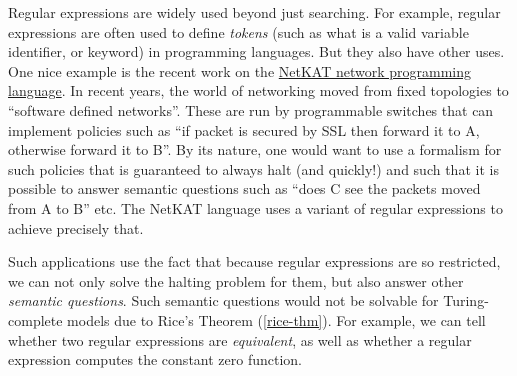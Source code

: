 Regular expressions are widely used beyond just searching. For example,
regular expressions are often used to define \emph{tokens} (such as what
is a valid variable identifier, or keyword) in programming languages.
But they also have other uses. One nice example is the recent work on
the \href{https://goo.gl/oeJNuw}{NetKAT network programming language}.
In recent years, the world of networking moved from fixed topologies to
``software defined networks''. These are run by programmable switches
that can implement policies such as ``if packet is secured by SSL then
forward it to A, otherwise forward it to B''. By its nature, one would
want to use a formalism for such policies that is guaranteed to always
halt (and quickly!) and such that it is possible to answer semantic
questions such as ``does C see the packets moved from A to B'' etc. The
NetKAT language uses a variant of regular expressions to achieve
precisely that.

Such applications use the fact that because regular expressions are so
restricted, we can not only solve the halting problem for them, but also
answer other \emph{semantic questions}. Such semantic questions would
not be solvable for Turing-complete models due to Rice's Theorem
(\cref{rice-thm}). For example, we can tell whether two regular
expressions are \emph{equivalent}, as well as whether a regular
expression computes the constant zero function.

\hypertarget{regemptynessthm}{}


